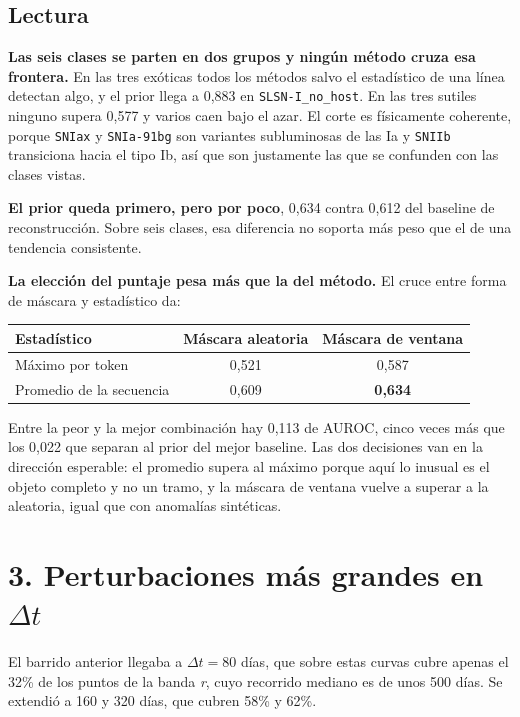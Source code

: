 \documentclass[11pt,a4paper]{article}
\begin{document}
\subsection*{Lectura}

\textbf{Las seis clases se parten en dos grupos y ningún método cruza esa frontera.} En las
tres exóticas todos los métodos salvo el estadístico de una línea detectan algo, y el prior
llega a 0,883 en \texttt{SLSN-I\_no\_host}. En las tres sutiles ninguno supera 0,577 y varios
caen bajo el azar. El corte es físicamente coherente, porque \texttt{SNIax} y
\texttt{SNIa-91bg} son variantes subluminosas de las Ia y \texttt{SNIIb} transiciona hacia el
tipo Ib, así que son justamente las que se confunden con las clases vistas.

\textbf{El prior queda primero, pero por poco}, 0,634 contra 0,612 del baseline de
reconstrucción. Sobre seis clases, esa diferencia no soporta más peso que el de una
tendencia consistente.

\textbf{La elección del puntaje pesa más que la del método.} El cruce entre forma de máscara
y estadístico da:

\begin{table}[H]
\centering
\small
\begin{tabular}{@{}lcc@{}}
\toprule
\textbf{Estadístico} & \textbf{Máscara aleatoria} & \textbf{Máscara de ventana} \\
\midrule
Máximo por token          & 0,521 & 0,587 \\
Promedio de la secuencia  & 0,609 & \textbf{0,634} \\
\bottomrule
\end{tabular}
\end{table}

Entre la peor y la mejor combinación hay 0,113 de AUROC, cinco veces más que los 0,022 que
separan al prior del mejor baseline. Las dos decisiones van en la dirección esperable: el
promedio supera al máximo porque aquí lo inusual es el objeto completo y no un tramo, y la
máscara de ventana vuelve a superar a la aleatoria, igual que con anomalías sintéticas.

\section*{3. Perturbaciones más grandes en $\Delta t$}

El barrido anterior llegaba a $\Delta t = 80$ días, que sobre estas curvas cubre apenas el
32\% de los puntos de la banda \textit{r}, cuyo recorrido mediano es de unos 500 días. Se
extendió a 160 y 320 días, que cubren 58\% y 62\%.
\end{document}
